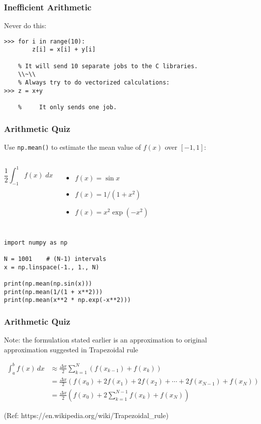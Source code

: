 \begin{frame}[fragile]
    \frametitle{Inefficient Arithmetic}

    Never do this:
    \begin{lstlisting}
>>> for i in range(10):
        z[i] = x[i] + y[i]
		
    % It will send 10 separate jobs to the C libraries.
    \\~\\
    % Always try to do vectorized calculations:
>>> z = x+y

	%     It only sends one job.
    \end{lstlisting}
\end{frame}

\begin{frame}[fragile]\frametitle{Arithmetic Quiz}

    Use \lstinline|np.mean()| to estimate the mean value of $f(x)$ over $[-1,1]$:

    \begin{columns}
            \[ \frac{1}{2} \int_{-1}^{1} f(x) \; dx \]
            \begin{itemize}
                \item $f(x) = \sin x$
                \item $f(x) = 1/(1 + x^2)$
                \item $f(x) = x^2 \exp(-x^2)$
            \end{itemize}
    \end{columns}
    \begin{lstlisting}
import numpy as np

N = 1001    # (N-1) intervals
x = np.linspace(-1., 1., N)

print(np.mean(np.sin(x)))
print(np.mean(1/(1 + x**2)))
print(np.mean(x**2 * np.exp(-x**2)))
    \end{lstlisting}
	
\end{frame}

\begin{frame}[fragile]\frametitle{Arithmetic Quiz}

Note: the formulation stated earlier is an approximation to original approximation suggested in Trapezoidal rule

\begin{align*}
\int_{a}^{b} f(x)\, dx & \approx \frac{\Delta x}{2} \sum_{k=1}^{N} \left( f(x_{k-1}) + f(x_{k}) \right) \\
&= \frac{\Delta x}{2} ( f(x_0) + 2f(x_1) + 2f(x_2) + \dotsb + 2f(x_{N-1}) + f(x_N) )\\
&= \frac{\Delta x}{2} \left( f(x_0) + 2\sum_{k=1}^{N-1} f(x_k) + f(x_N) \right) 
\end{align*}

(Ref: https://en.wikipedia.org/wiki/Trapezoidal\_rule)
\end{frame}


